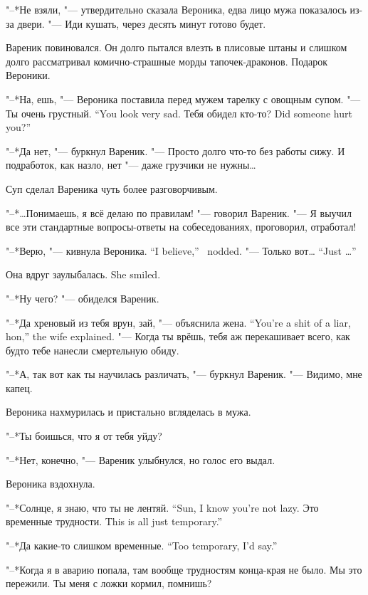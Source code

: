 \asterism

"--*Не взяли, "--- утвердительно сказала Вероника, едва лицо мужа показалось из-за двери.
"--- Иди кушать, через десять минут готово будет.

Вареник повиновался.
Он долго пытался влезть в плисовые штаны и слишком долго рассматривал комично-страшные морды тапочек-драконов.
Подарок Вероники.

"--*На, ешь, "--- Вероника поставила перед мужем тарелку с овощным супом.
{"--- Ты очень грустный.}
{``You look very sad.}
{Тебя обидел кто-то?}
{Did someone hurt you?''}

"--*Да нет, "--- буркнул Вареник.
"--- Просто долго что-то без работы сижу.
И подработок, как назло, нет "--- даже грузчики не нужны\ldots{}

Суп сделал Вареника чуть более разговорчивым.

"--*\ldots{}Понимаешь, я всё делаю по правилам! "--- говорил Вареник.
"--- Я выучил все эти стандартные вопросы-ответы на собеседованиях, проговорил, отработал!

{"--*Верю, "--- кивнула Вероника.}
{``I believe,'' \Veronika\ nodded.}
{"--- Только вот\ldots{}}
{``Just \ldots{}''}

{Она вдруг заулыбалась.}
{She smiled.}

"--*Ну чего? "--- обиделся Вареник.

{"--*Да хреновый из тебя врун, зай, "--- объяснила жена.}
{``You're a shit of a liar, hon,'' the wife explained.}
"--- Когда ты врёшь, тебя аж перекашивает всего, как будто тебе нанесли смертельную обиду.

"--*А, так вот как ты научилась различать, "--- буркнул Вареник.
"--- Видимо, мне капец.

Вероника нахмурилась и пристально вгляделась в мужа.

"--*Ты боишься, что я от тебя уйду?

"--*Нет, конечно, "--- Вареник улыбнулся, но голос его выдал.

Вероника вздохнула.

{"--*Солнце, я знаю, что ты не лентяй.}
{``Sun, I know you're not lazy.}
{Это временные трудности.}
{This is all just temporary.''}

{"--*Да какие-то слишком временные.}
{``Too temporary, I'd say.''}

"--*Когда я в аварию попала, там вообще трудностям конца-края не было.
Мы это пережили.
Ты меня с ложки кормил, помнишь?


